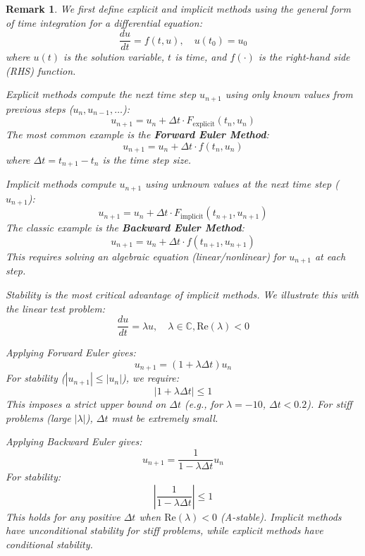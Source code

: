 \documentclass[preprint,times,3p]{elsarticle}
\newtheorem{remark}{Remark}
\begin{document}
\begin{remark}
We first define explicit and implicit methods using the general form of time integration for a differential equation:
\[
\frac{du}{dt} = f(t, u), \quad u(t_0) = u_0
\]
where $u(t)$ is the solution variable, $t$ is time, and $f(\cdot)$ is the right-hand side (RHS) function.

Explicit methods compute the next time step $u_{n+1}$ using only \textit{known} values from previous steps ($u_n, u_{n-1}, \dots$):
\[
u_{n+1} = u_n + \Delta t \cdot F_{\text{explicit}}(t_n, u_n)
\]
The most common example is the \textbf{Forward Euler Method}:
\[
u_{n+1} = u_n + \Delta t \cdot f(t_n, u_n)
\]
where $\Delta t = t_{n+1} - t_n$ is the time step size.

Implicit methods compute $u_{n+1}$ using \textit{unknown} values at the next time step ($u_{n+1}$):
\[
u_{n+1} = u_n + \Delta t \cdot F_{\text{implicit}}(t_{n+1}, u_{n+1})
\]
The classic example is the \textbf{Backward Euler Method}:
\[
u_{n+1} = u_n + \Delta t \cdot f(t_{n+1}, u_{n+1})
\]
This requires solving an algebraic equation (linear/nonlinear) for $u_{n+1}$ at each step.

Stability is the most critical advantage of implicit methods. We illustrate this with the linear test problem:
\[
\frac{du}{dt} = \lambda u, \quad \lambda \in \mathbb{C}, \text{Re}(\lambda) < 0
\]

Applying Forward Euler gives:
\[
u_{n+1} = (1 + \lambda \Delta t) u_n
\]
For stability ($|u_{n+1}| \leq |u_n|$), we require:
\[
|1 + \lambda \Delta t| \leq 1
\]
This imposes a \textit{strict upper bound} on $\Delta t$ (e.g., for $\lambda = -10$, $\Delta t < 0.2$). For stiff problems (large $|\lambda|$), $\Delta t$ must be extremely small.

Applying Backward Euler gives:
\[
u_{n+1} = \frac{1}{1 - \lambda \Delta t} u_n
\]
For stability:
\[
\left| \frac{1}{1 - \lambda \Delta t} \right| \leq 1
\]
This holds for \textit{any positive} $\Delta t$ when $\text{Re}(\lambda) < 0$ (A-stable). Implicit methods have \textit{unconditional stability} for stiff problems, while explicit methods have \textit{conditional stability}.
\end{remark}
\end{document}

